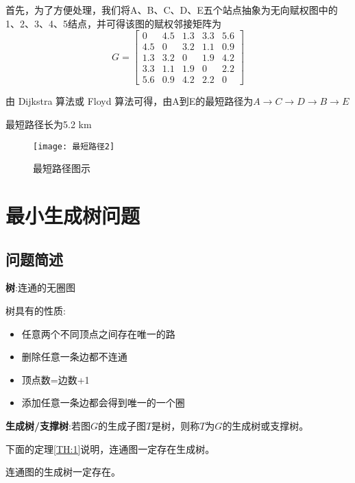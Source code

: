\documentclass[withoutpreface]{cumcmthesis}
\begin{document}
首先，为了方便处理，我们将A、B、C、D、E五个站点抽象为无向赋权图中的1、2、3、4、5结点，并可得该图的赋权邻接矩阵为
\begin{equation}
  G =
  \begin{bmatrix}
    0   & 4.5 & 1.3 & 3.3 & 5.6 \\
    4.5 & 0   & 3.2 & 1.1 & 0.9 \\
    1.3 & 3.2 & 0   & 1.9 & 4.2 \\
    3.3 & 1.1 & 1.9 & 0   & 2.2 \\
    5.6 & 0.9 & 4.2 & 2.2 & 0
  \end{bmatrix}
\end{equation}

由 Dijkstra 算法或 Floyd 算法可得，由A到E的最短路径为$A\rightarrow C \rightarrow D \rightarrow B \rightarrow E$

最短路径长为5.2 km

\begin{figure}[H]
  \centering
  \texttt{[image: 最短路径2]}
  \vspace{-0.2cm}
  \caption{最短路径图示}
\end{figure}


\section{最小生成树问题}

\subsection{问题简述}
\textbf{树}:连通的无圈图

\vspace{0.2cm}
树具有的性质:

\vspace{-0.2cm}
\begin{itemize}
  \item 任意两个不同顶点之间存在唯一的路
  \item 删除任意一条边都不连通
  \item 顶点数=边数+1
  \item 添加任意一条边都会得到唯一的一个圈
\end{itemize}

\textbf{生成树/支撑树}:若图$G$的生成子图$T$是树，则称$T$为$G$的生成树或支撑树。

\vspace{0.2cm}
下面的定理\ref{TH:1}说明，连通图一定存在生成树。


\begin{theorem}\label{TH:1}
  连通图的生成树一定存在。
\end{theorem}
\end{document}
